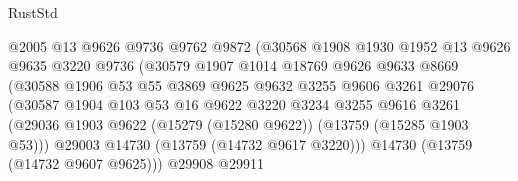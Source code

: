\begin{lexlean}{RustStd}
\begin{coremodule}
                                  @2005
                                  @13
                                  @9626
                                  @9736
                                  @9762
                                  @9872
                                  (@30568
                                    @1908
                                    @1930
                                    @1952
                                    @13
                                    @9626
                                    @9635
                                    @3220
                                    @9736
                                    (@30579
                                      @1907
                                      @1014
                                      @18769
                                      @9626
                                      @9633
                                      @8669
                                      (@30588
                                        @1906
                                        @53
                                        @55
                                        @3869
                                        @9625
                                        @9632
                                        @3255
                                        @9606
                                        @3261
                                        @29076
                                        (@30587
                                          @1904
                                          @103
                                          @53
                                          @16
                                          @9622
                                          @3220
                                          @3234
                                          @3255
                                          @9616
                                          @3261
                                          (@29036
                                            @1903
                                            @9622
                                            (@15279 (@15280 @9622))
                                            (@13759 (@15285 @1903 @53)))
                                          @29003
                                          @14730
                                          (@13759 (@14732 @9617 @3220)))
                                        @14730
                                        (@13759 (@14732 @9607 @9625)))
                                      @29908
                                      @29911

\end{coremodule}
\end{lexlean}
